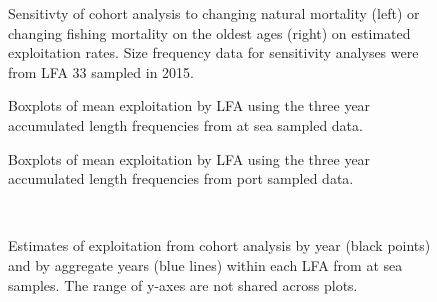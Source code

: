 \documentclass[11pt]{article}
\newcommand{\e}{/backup/bio_data/bio.lobster/figures/} %
\begin{document}
\begin{landscape}

\begin{figure}
\centering
              \caption{Sensitivty of cohort analysis to changing natural mortality (left) or changing fishing mortality on the oldest ages (right) on estimated exploitation rates. Size frequency data for sensitivity analyses were from LFA 33 sampled in 2015.}
\end{figure}


\begin{figure}
\centering
              \caption{Boxplots of mean exploitation by LFA using the three year accumulated length frequencies from at sea sampled data.}
\end{figure}

\begin{figure}
\centering
              \caption{Boxplots of mean exploitation by LFA using the three year accumulated length frequencies from port sampled data.}
\end{figure}


\begin{figure}
        \centering
         \\
                    
                    \caption{Estimates of exploitation from cohort analysis by year (black points) and by aggregate years (blue lines) within each LFA from at sea samples. The range of y-axes are not shared across plots.}
        \end{figure}


\end{landscape}
\end{document}
